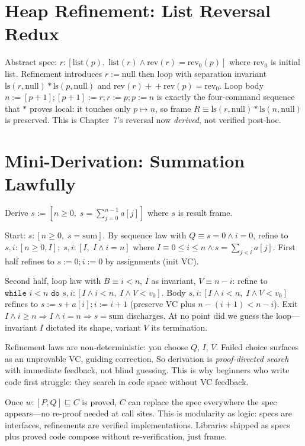 \section{Heap Refinement: List Reversal Redux}
\label{sec:heap-refine}
Abstract spec: $r:[\text{list}(p),\; \text{list}(r)\land\text{rev}(r)=\text{rev}_0(p)]$ where $\text{rev}_0$ is initial list. Refinement introduces $r:=\text{null}$ then loop with separation invariant $\text{ls}(r,\text{null}) * \text{ls}(p,\text{null})$ and $\text{rev}(r)\!+\!+\!\text{rev}(p)=\text{rev}_0$. Loop body $n:=[p+1];[p+1]:=r;r:=p;p:=n$ is exactly the four-command sequence that $*$ proves local: it touches only $p\mapsto n$, so frame $R\equiv\text{ls}(r,\text{null})*\text{ls}(n,\text{null})$ is preserved. This is Chapter~7's reversal now \emph{derived}, not verified post-hoc.

\section{Mini-Derivation: Summation Lawfully}
\label{sec:mini-sum}
Derive $s:=[n\ge0,\;s=\sum_{j=0}^{n-1}a[j]]$ where $s$ is result frame.

Start: $s:[n\ge0,\;s=\text{sum}]$. By sequence law with $Q\equiv s=0\land i=0$, refine to $s,i:[n\ge0,I];\;s,i:[I,\;I\land i=n]$ where $I\equiv0\le i\le n\land s=\sum_{j<i}a[j]$. First half refines to $s:=0;i:=0$ by assignments (init VC).

Second half, loop law with $B\equiv i<n$, $I$ as invariant, $V\equiv n-i$: refine to $\texttt{while }i<n\texttt{ do }s,i:[I\land i<n,\;I\land V<v_0]$. Body $s,i:[I\land i<n,\;I\land V<v_0]$ refines to $s:=s+a[i];i:=i+1$ (preserve VC plus $n-(i+1)<n-i$). Exit $I\land i\ge n\Rightarrow I\land i=n\Rightarrow s=\text{sum}$ discharges. At no point did we guess the loop—invariant $I$ dictated its shape, variant $V$ its termination.

\begin{remark}
Refinement laws are non-deterministic: you choose $Q$, $I$, $V$. Failed choice surfaces as an unprovable VC, guiding correction. So derivation is \emph{proof-directed search} with immediate feedback, not blind guessing. This is why beginners who write code first struggle: they search in code space without VC feedback.
\end{remark}

\begin{remark}
Once $w:[P,Q]\sqsubseteq C$ is proved, $C$ can replace the spec everywhere the spec appears—no re-proof needed at call sites. This is modularity as logic: specs are interfaces, refinements are verified implementations. Libraries shipped as specs plus proved code compose without re-verification, just frame.
\end{remark}

